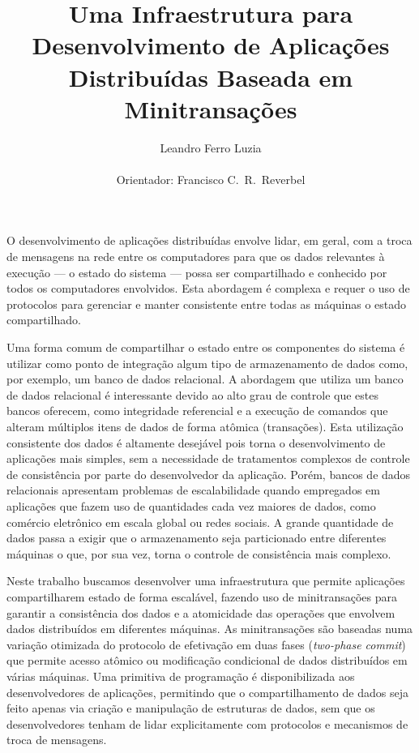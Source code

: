 \documentclass[11pt]{article}
\begin{document}
\large
\title{Uma Infraestrutura para Desenvolvimento de Aplicações Distribuídas Baseada em Minitransações}
\author{Leandro Ferro Luzia\\
\mbox{\ \ }\\
Orientador: Francisco C.\ R.\ Reverbel}
\date{}
\maketitle
\thispagestyle{empty}

O desenvolvimento de aplicações distribuídas envolve lidar, em geral, com a troca de mensagens na rede entre os computadores para que os dados relevantes à execução --- o estado do sistema --- possa ser compartilhado e conhecido por todos os computadores envolvidos. Esta abordagem é complexa e requer o uso de protocolos para gerenciar e manter consistente entre todas as máquinas o estado compartilhado.

Uma forma comum de compartilhar o estado entre os componentes do sistema é utilizar como ponto de integração algum tipo de armazenamento de dados como, por exemplo, um banco de dados relacional. A abordagem que utiliza um banco de dados relacional é interessante devido ao alto grau de controle que estes bancos oferecem, como integridade referencial e a execução de comandos que alteram múltiplos itens de dados de forma atômica (transações). Esta utilização consistente dos dados é altamente desejável pois torna o desenvolvimento de aplicações mais simples, sem a necessidade de tratamentos complexos de controle de consistência por parte do desenvolvedor da aplicação. Porém, bancos de dados relacionais apresentam problemas de escalabilidade quando empregados em aplicações que fazem uso de quantidades cada vez maiores de dados, como comércio eletrônico em escala global ou redes sociais. A grande quantidade de dados passa a exigir que o armazenamento seja particionado entre diferentes máquinas o que, por sua vez, torna o controle de consistência mais complexo.

Neste trabalho buscamos desenvolver uma infraestrutura que permite aplicações compartilharem estado de forma escalável, fazendo uso de minitransações para garantir a consistência dos dados e a atomicidade das operações que envolvem dados distribuídos em diferentes máquinas. As minitransações são baseadas numa variação otimizada do protocolo de efetivação em duas fases (\emph{two-phase commit}) que permite acesso atômico ou modificação condicional de dados distribuídos em várias máquinas. Uma primitiva de programação é disponibilizada aos desenvolvedores de aplicações, permitindo que o compartilhamento de dados seja feito apenas via criação e manipulação de estruturas de dados, sem que os desenvolvedores tenham de lidar explicitamente com protocolos e mecanismos de troca de mensagens.
\end{document}
